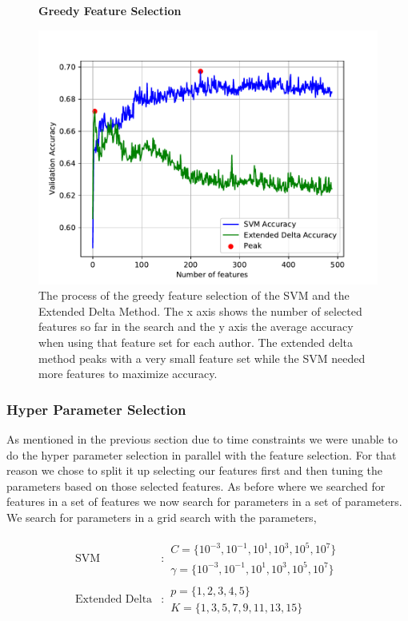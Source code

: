 \begin{figure}
    \centering
    \textbf{Greedy Feature Selection}\par\medskip
    \includegraphics[scale=0.6]{./pictures/experiments/feature_selection}
    \caption{The process of the greedy feature selection of the SVM and the
        Extended Delta Method. The x axis shows the number of selected features
        so far in the search and the y axis the average accuracy when using that
        feature set for each author. The extended delta method peaks with a very
        small feature set while the \gls{SVM} needed more features to maximize
        accuracy.
    }
    \label{fig:fs_results}
\end{figure}


\subsubsection{Hyper Parameter Selection}\label{sec:hyp_select}

As mentioned in the previous section due to time constraints we were unable to
do the hyper parameter selection in parallel with the feature selection. For
that reason we chose to split it up selecting our features first and then tuning
the parameters based on those selected features. As before where we searched
for features in a set of features we now search for parameters in a set of
parameters. We search for parameters in a grid search with the parameters,

\begin{align}
    \text{SVM} &:
    \begin{array}{lr}
        C=\{10^{-3}, 10^{-1}, 10^{1}, 10^{3}, 10^{5}, 10^7\}\\
        \gamma=\{10^{-3}, 10^{-1}, 10^{1}, 10^{3}, 10^{5}, 10^7\}
    \end{array} \\
    \text{Extended Delta} &:
    \begin{array}{lr}
        p=\{1,2,3,4,5\}\\
        K=\{1,3,5,7,9,11,13,15\}
    \end{array}
\end{align}

